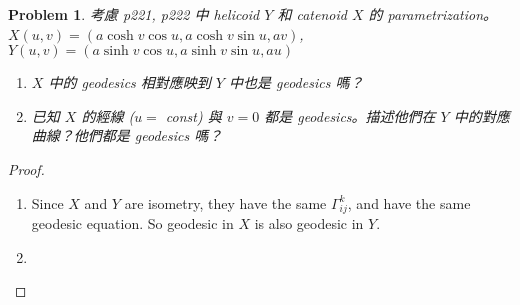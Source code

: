 \documentclass[10pt,a4paper]{article}
\newcounter{theProblemCounter}
\newtheorem{problem}[theProblemCounter]{Problem}
\begin{document}
\setcounter{theProblemCounter}{8}
\begin{problem}
考慮 p221, p222 中 helicoid $Y$ 和 catenoid $X$ 的 parametrization。\\
$X(u,v)=(a\cosh{v}\cos{u},a\cosh{v}\sin{u},av)$, $Y(u,v)=(a\sinh{v}\cos{u},a\sinh{v}\sin{u},au)$
\begin{enumerate}
\item[(a)] $X$ 中的 geodesics 相對應映到 $Y$ 中也是 geodesics 嗎？
\item[(b)] 已知 $X$ 的經線 ($u = $ const) 與 $v=0$ 都是 geodesics。描述他們在 $Y$ 中的對應曲線？他們都是 geodesics 嗎？
\end{enumerate}
\end{problem}
\begin{proof}
\begin{enumerate}
\item[(a)]
Since $X$ and $Y$ are isometry, they have the same $\Gamma^{k}_{ij}$, and have the same geodesic equation. So geodesic in $X$ is also geodesic in $Y$.
\item[(b)]
\end{enumerate}
\end{proof}
\end{document}
